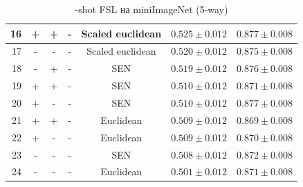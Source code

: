 \documentclass[a4paper, 12pt]{report}
\begin{document}
\begin{table}[h!]
\begin{adjustbox}{center}
\begin{tabular}{| r | c c c c | c |  c | }
\hline
 16 & +               & +      & -      & Scaled euclidean & $0.525 \pm 0.012$ & $0.877 \pm 0.008$ \\
\hline
 17 & -               & -      & -      & Scaled euclidean & $0.520 \pm 0.012$ & $0.875 \pm 0.008$ \\
\hline
 18 & -               & +      & -      & SEN              & $0.519 \pm 0.012$ & $0.876 \pm 0.008$ \\
\hline
 19 & +               & +      & -      & SEN              & $0.510 \pm 0.012$ & $0.871 \pm 0.008$ \\
\hline
 20 & +               & -      & -      & SEN              & $0.510 \pm 0.012$ & $0.877 \pm 0.008$ \\
\hline
 21 & +               & +      & -      & Euclidean        & $0.509 \pm 0.012$ & $0.869 \pm 0.008$ \\
\hline
 22 & +               & -      & -      & Euclidean        & $0.509 \pm 0.012$ & $0.870 \pm 0.008$ \\
\hline
 23 & -               & -      & -      & SEN              & $0.508 \pm 0.012$ & $0.872 \pm 0.008$ \\
\hline
 24 & -               & -      & -      & Euclidean        & $0.501 \pm 0.012$ & $0.871 \pm 0.008$ \\
\hline
\end{tabular}
\end{adjustbox}
	\caption{-shot FSL на miniImageNet (5-way)}
\end{table}
\end{document}
